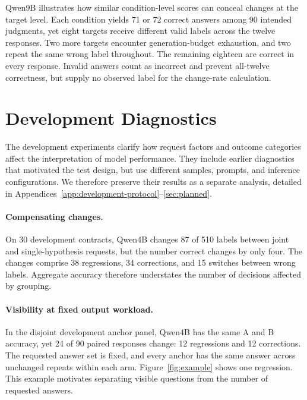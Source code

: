 \documentclass{article}
\begin{document}
Qwen9B illustrates how similar condition-level scores can conceal changes at the target level. Each condition yields 71 or 72 correct answers among 90 intended judgments, yet eight targets receive different valid labels across the twelve responses. Two more targets encounter generation-budget exhaustion, and two repeat the same wrong label throughout. The remaining eighteen are correct in every response. Invalid answers count as incorrect and prevent all-twelve correctness, but supply no observed label for the change-rate calculation.







\section{Development Diagnostics}
\label{sec:diagnostics}
The development experiments clarify how request factors and outcome categories affect the interpretation of model performance. They include earlier diagnostics that motivated the test design, but use different samples, prompts, and inference configurations. We therefore preserve their results as a separate analysis, detailed in Appendices~\ref{app:development-protocol}--\ref{sec:planned}.

\paragraph{Compensating changes.}
On 30 development contracts, Qwen4B changes 87 of 510 labels between joint and single-hypothesis requests, but the number correct changes by only four. The changes comprise 38 regressions, 34 corrections, and 15 switches between wrong labels. Aggregate accuracy therefore understates the number of decisions affected by grouping.

\paragraph{Visibility at fixed output workload.}
In the disjoint development anchor panel, Qwen4B has the same A and B accuracy, yet 24 of 90 paired responses change: 12 regressions and 12 corrections. The requested answer set is fixed, and every anchor has the same answer across unchanged repeats within each arm. Figure~\ref{fig:example} shows one regression. This example motivates separating visible questions from the number of requested answers.
\end{document}
